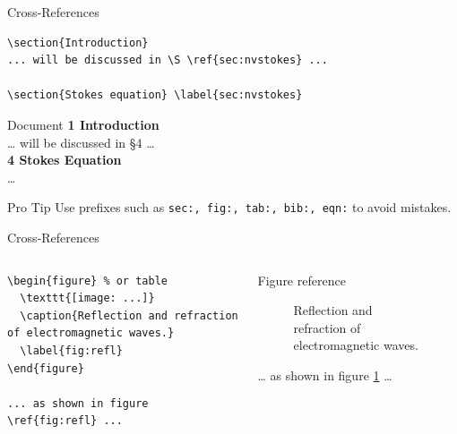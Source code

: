 \documentclass[xetex, onlymath]{beamer}
\begin{document}
\begin{frame}[fragile]{Cross-References}
\begin{lstlisting}
\section{Introduction} 
... will be discussed in \S \ref{sec:nvstokes} ...

\section{Stokes equation} \label{sec:nvstokes}
\end{lstlisting}

\begin{exampleblock}{Document}
\textbf{1\; Introduction} \\[.2em]
\ldots{} will be discussed in \S 4 \ldots{}
\\[1em]

\textbf{4\; Stokes Equation} \\[.2em]
\ldots{}
\end{exampleblock}

\begin{alertblock}{Pro Tip}
Use prefixes such as \texttt{sec:, fig:, tab:, bib:, eqn:} to avoid mistakes.
\end{alertblock}
\end{frame}

\begin{frame}[fragile]{Cross-References}
\begin{columns}
\begin{column}{.5\linewidth}
\begin{lstlisting}
\begin{figure} % or table
  \texttt{[image: ...]}
  \caption{Reflection and refraction of electromagnetic waves.}
  \label{fig:refl}
\end{figure}

... as shown in figure
\ref{fig:refl} ...
\end{lstlisting}
\end{column}
\begin{column}{.5\linewidth}
\begin{exampleblock}{Figure reference}
\begin{figure}[h]
	\newsavebox{}%
	\begin{lrbox}{}%
		
	\end{lrbox}
	\caption{Reflection and refraction of electromagnetic waves.}
	\label{fig:refract}
\end{figure}
\ldots{} as shown in figure \ref{fig:refract} \ldots{}
\end{exampleblock}
\end{column}
\end{columns}
\end{frame}
\end{document}
